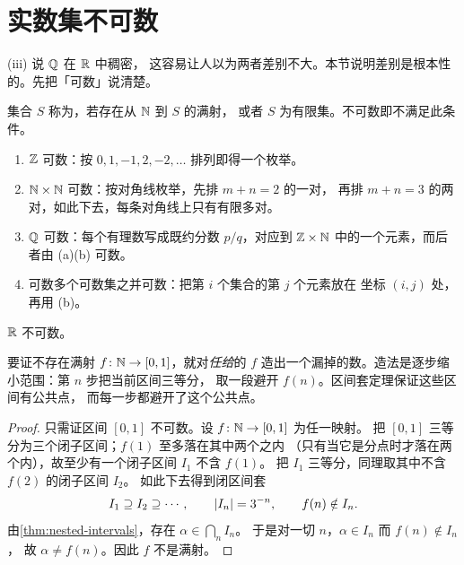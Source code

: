 \section{实数集不可数}
\label{sec:uncountable}

(iii) 说 \(\mathbb{Q}\) 在 \(\mathbb{R}\) 中稠密，
这容易让人以为两者差别不大。本节说明差别是根本性的。先把「可数」说清楚。

\begin{definition}[可数]
  \label{def:countable}
  集合 \(S\) 称为，若存在从 \(\mathbb{N}\) 到 \(S\) 的满射，
  或者 \(S\) 为有限集。不可数即不满足此条件。
\end{definition}

\begin{example}[几个可数集]
  \label{ex:countable}
  \begin{enumerate}[label=(\alph*)]
    \item \(\mathbb{Z}\) 可数：按 \(0, 1, -1, 2, -2, \dots\) 排列即得一个枚举。
    \item \(\mathbb{N} \times \mathbb{N}\) 可数：按对角线枚举，先排 \(m+n = 2\) 的一对，
          再排 \(m+n = 3\) 的两对，如此下去，每条对角线上只有有限多对。
    \item \(\mathbb{Q}\) 可数：每个有理数写成既约分数 \(p/q\)，对应到 \(\mathbb{Z} \times \mathbb{N}\)
          中的一个元素，而后者由 (a)(b) 可数。
    \item 可数多个可数集之并可数：把第 \(i\) 个集合的第 \(j\) 个元素放在
          坐标 \((i,j)\) 处，再用 (b)。
  \end{enumerate}
\end{example}

\begin{theorem}[康托尔]
  \label{thm:uncountable}
  \(\mathbb{R}\) 不可数。
\end{theorem}

\begin{strategy}
  要证不存在满射 \(f \colon \mathbb{N} \to [0,1]\)，就对\emph{任给}的 \(f\)
  造出一个漏掉的数。造法是逐步缩小范围：第 \(n\) 步把当前区间三等分，
  取一段避开 \(f(n)\)。区间套定理保证这些区间有公共点，
  而每一步都避开了这个公共点。
\end{strategy}

\begin{proof}
  只需证区间 \([0,1]\) 不可数。设 \(f \colon \mathbb{N} \to [0,1]\) 为任一映射。
  把 \([0,1]\) 三等分为三个闭子区间；\(f(1)\) 至多落在其中两个之内
  （只有当它是分点时才落在两个内），故至少有一个闭子区间 \(I_{1}\) 不含 \(f(1)\)。
  把 \(I_{1}\) 三等分，同理取其中不含 \(f(2)\) 的闭子区间 \(I_{2}\)。
  如此下去得到闭区间套
  \begin{equation}
    \label{eq:nested-intervals}
    I_{1} \supseteq I_{2} \supseteq \cdots, \qquad
    \lvert I_{n}\rvert = 3^{-n}, \qquad f(n) \notin I_{n}.
  \end{equation}
  由\cref{thm:nested-intervals}，存在 \(\alpha \in \bigcap_{n} I_{n}\)。
  于是对一切 \(n\)，\(\alpha \in I_{n}\) 而 \(f(n) \notin I_{n}\)，
  故 \(\alpha \neq f(n)\)。因此 \(f\) 不是满射。
\end{proof}

